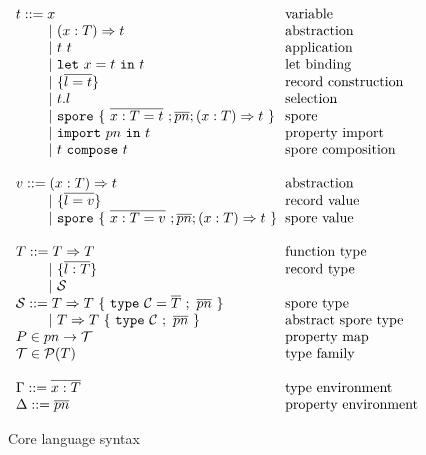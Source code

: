 \documentclass{llncs}
\newcommand{\seq}[1]{\overline{#1}}
\newcommand{\ba}{\begin{array}}
\newcommand{\ea}{\end{array}}
\newcommand{\gap}{\quad\quad}
\begin{document}
\begin{figure}[ht!]
  \centering

  $\ba[t]{l@{\hspace{2mm}}l}
t ::=     x                                 & \mbox{variable}
\\
\gap ~|~  (x: T) \Rightarrow t              & \mbox{abstraction}
\\
\gap ~|~  t~t                               & \mbox{application}
\\
\gap ~|~  \texttt{let}~x = t~\texttt{in}~t  & \mbox{let binding}
\\
\gap ~|~  \{ \seq{l = t} \}                 & \mbox{record construction}
\\
\gap ~|~  t.l                               & \mbox{selection}
\\
\gap ~|~  \texttt{spore}~\{~\seq{x : T = t}~; \seq{pn} ; (x: T) \Rightarrow t~\}  & \mbox{spore}
\\
\gap ~|~  \texttt{import}~pn~\texttt{in}~t  & \mbox{property import}
\\
\gap ~|~  t~\texttt{compose}~t              & \mbox{spore composition}
\\
 & \\
v ::=     (x: T) \Rightarrow t              & \mbox{abstraction}
\\
\gap ~|~  \{ \seq{l = v} \}                 & \mbox{record value}
\\
\gap ~|~  \texttt{spore}~\{~\seq{x : T = v}~; \seq{pn} ; (x: T) \Rightarrow t~\}  & \mbox{spore value}
\\
 & \\
T ::=     T \Rightarrow T                   & \mbox{function type} \\
\gap ~|~  \{ \seq{l : T} \}                 & \mbox{record type}   \\
\gap ~|~  \mathcal{S}                       & \mbox{}
\\
\mathcal{S} ::= T \Rightarrow T~\{~\texttt{type}~\mathcal{C} = \seq{T}~;~\seq{pn}~\}   & \mbox{spore type}
\\
\gap ~|~  T \Rightarrow T~\{~\texttt{type}~\mathcal{C}~;~\seq{pn}~\}   & \mbox{abstract spore type}
\\
P \in pn \rightarrow \mathcal{T} & \mbox {property map}
\\
\mathcal{T} \in \mathcal{P}(T)   & \mbox{type family}
\\
 & \\
\Gamma ::=  \seq{x : T}          & \mbox{type environment}
\\
\Delta ::=  \seq{pn}             & \mbox{property environment}
\\
\ea$

  \caption{Core language syntax}
  \label{fig:syntax}
\end{figure}
\end{document}
